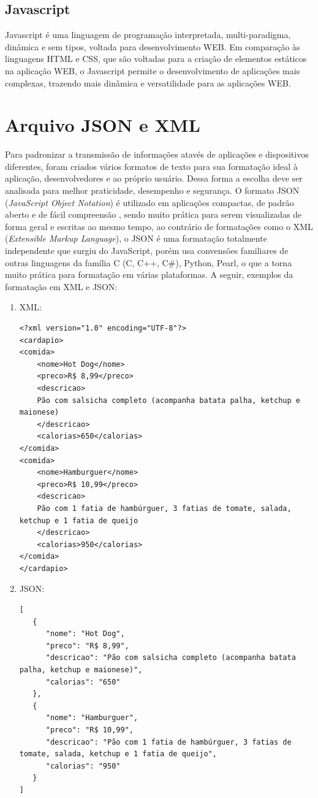 \documentclass[../../layout.tex]{subfiles}
\begin{document}
\subsection{Javascript}
\hspace*{3em}Javascript é uma linguagem de programação interpretada, multi-paradigma, dinâmica e sem tipos, voltada para desenvolvimento WEB. Em comparação às linguagens HTML e CSS, que são voltadas para a criação de elementos estáticos na aplicação WEB, o Javascript permite o desenvolvimento de aplicações mais complexas, trazendo mais dinâmica e versatilidade para as aplicações WEB.\cite{frontend}

\section{Arquivo JSON e XML}
\hspace*{3em}Para padronizar a transmissão de informações atavés de aplicações e dispositivos diferentes, foram criados vários formatos de texto para sua formatação ideal à aplicação, desenvolvedores e ao próprio usuário. Dessa forma a escolha deve ser analisada para melhor praticidade, desempenho e segurança. O formato JSON (\textit{JavaScript Object Notation}) é utilizado em aplicações compactas, de padrão aberto e de fácil compreensão , sendo muito prática para serem visualizadas de forma geral e escritas ao mesmo tempo, ao contrário de formatações como o XML (\textit{Extensible Markup Language}), o JSON é uma formatação totalmente independente que surgiu do JavaScript, porém usa convensões familiares de outras linguagens da família C (C, C++, C\#), Python, Pearl, o que a torna muito prática para formatação em várias plataformas. A seguir, exemplos da formatação em XML e JSON:

\begin{enumerate}[label=\alph*)]
\itemsep0em
  \item XML:
    \begin{verbatim}
<?xml version="1.0" encoding="UTF-8"?>
<cardapio>
<comida>
    <nome>Hot Dog</nome>
    <preco>R$ 8,99</preco>
    <descricao>
   	Pão com salsicha completo (acompanha batata palha, ketchup e maionese)
   	</descricao>
    <calorias>650</calorias>
</comida>
<comida>
    <nome>Hamburguer</nome>
    <preco>R$ 10,99</preco>
    <descricao>
    Pão com 1 fatia de hambúrguer, 3 fatias de tomate, salada, ketchup e 1 fatia de queijo
    </descricao>
    <calorias>950</calorias>
</comida>
</cardapio>
    \end{verbatim}
  
  \item JSON:
    \begin{verbatim}
[
   {
      "nome": "Hot Dog",
      "preco": "R$ 8,99",
      "descricao": "Pão com salsicha completo (acompanha batata palha, ketchup e maionese)",
      "calorias": "650"
   },
   {
      "nome": "Hamburguer",
      "preco": "R$ 10,99",
      "descricao": "Pão com 1 fatia de hambúrguer, 3 fatias de tomate, salada, ketchup e 1 fatia de queijo",
      "calorias": "950"
   }
]
    \end{verbatim}
\end{enumerate}
\end{document}
